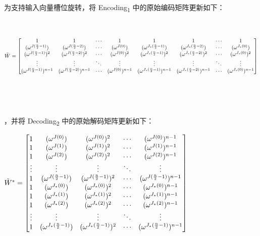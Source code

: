 \begin{tcolorbox}[title={\textbf{\tboxlabel{\ref*{subsec:bfv-rotation}} BFV 输入向量槽位的同态旋转}}]

为支持输入向量槽位旋转，将 \textsf{Encoding\textsubscript{1}} 中的原始编码矩阵更新如下：

$ $

{\footnotesize{\noindent $\tilde{W} = \begin{bmatrix}
1 & 1 & \cdots & 1 & 1 & 1 & \cdots & 1\\
(\omega^{J(\frac{n}{2} - 1)}) & (\omega^{J(\frac{n}{2} - 2)}) & \cdots & (\omega^{J(0)}) & (\omega^{J_*(\frac{n}{2} - 1)}) & (\omega^{J_*(\frac{n}{2} - 2)}) & \cdots & (\omega^{J_*(0)})\\
(\omega^{J(\frac{n}{2} - 1)})^2 & (\omega^{J(\frac{n}{2} - 2)})^2 & \cdots & (\omega^{J(0)})^2 & (\omega^{J_*(\frac{n}{2} - 1)})^2 & (\omega^{J_*(\frac{n}{2} - 2)})^2 & \cdots & (\omega^{J_*(0)})^2 \\
\vdots & \vdots & \ddots & \vdots & \vdots & \vdots & \ddots & \vdots \\
(\omega^{J(\frac{n}{2} - 1)})^{n-1} & (\omega^{J(\frac{n}{2} - 2)})^{n-1} & \cdots & (\omega^{J(0)})^{n-1} & (\omega^{J_*(\frac{n}{2} - 1)})^{n-1} & (\omega^{J_*(\frac{n}{2} - 2)})^{n-1} & \cdots  & (\omega^{J_*(0)})^{n-1}
\end{bmatrix}$}}

$ $

$ $


，并将 \textsf{Decoding\textsubscript{2}} 中的原始解码矩阵更新如下：

$\tilde{W}^* = \begin{bmatrix}
1 & (\omega^{J(0)}) & (\omega^{J(0)})^2 & \cdots & (\omega^{J(0)})^{n-1}\\
1 & (\omega^{J(1)}) & (\omega^{J(1)})^2 & \cdots & (\omega^{J(1)})^{n-1}\\
1 & (\omega^{J(2)}) & (\omega^{J(2)})^2 & \cdots & (\omega^{J(2)})^{n-1}\\
\vdots & \vdots & \vdots & \ddots & \vdots \\
1 & (\omega^{J(\frac{n}{2}-1)}) & (\omega^{J(\frac{n}{2}-1)})^2 & \cdots & (\omega^{J(\frac{n}{2}-1)})^{n-1}\\
1 & (\omega^{J_*(0)}) & (\omega^{J_*(0)})^2 & \cdots & (\omega^{J_*(0)})^{n-1}\\
1 & (\omega^{J_*(1)}) & (\omega^{J_*(1)})^2 & \cdots & (\omega^{J_*(1)})^{n-1}\\
1 & (\omega^{J_*(2)}) & (\omega^{J_*(2)})^2 & \cdots & (\omega^{J_*(2)})^{n-1}\\
\vdots & \vdots & \vdots & \ddots & \vdots \\
1 & (\omega^{J_*(\frac{n}{2}-1)}) & (\omega^{J_*(\frac{n}{2}-1)})^2 & \cdots & (\omega^{J_*(\frac{n}{2}-1)})^{n-1}\\
\end{bmatrix}$


\end{tcolorbox}
